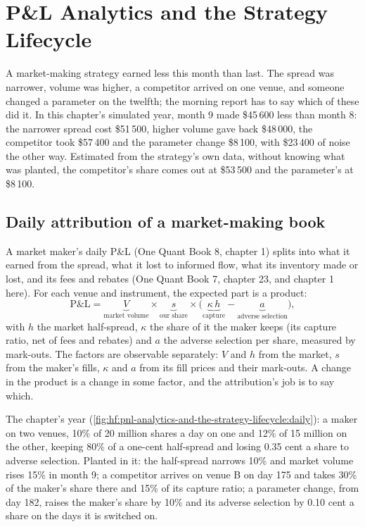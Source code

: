 \chapter{P\&L Analytics and the Strategy Lifecycle}\label{ch:hf:pnl-analytics-and-the-strategy-lifecycle}

A market-making strategy earned less this month than last. The spread was narrower, volume was higher, a competitor arrived on one venue, and
someone changed a parameter on the twelfth; the morning report has to say which of these did it. In this chapter's simulated year, month 9 made
\$45\,600 less than month 8: the narrower spread cost \$51\,500, higher volume gave back \$48\,000, the competitor took \$57\,400 and the parameter change
\$8\,100, with \$23\,400 of noise the other way. Estimated from the strategy's own data, without knowing what was planted, the competitor's share comes
out at \$53\,500 and the parameter's at \$8\,100.

\section{Daily attribution of a market-making book}

A market maker's daily P\&L (One Quant Book 8, chapter 1) splits into what it earned from the spread, what it lost to informed flow, what its
inventory made or lost, and its fees and rebates (One Quant Book 7, chapter 23, and chapter 1 here). For each venue and instrument, the expected part
is a product:
\[
\text{P\&L}=\underbrace{V}_{\text{market volume}}\times\underbrace{s}_{\text{our share}}\times\bigl(\underbrace{\kappa\,h}_{\text{capture}}
-\underbrace{a}_{\text{adverse selection}}\bigr),
\]
with $h$ the market half-spread, $\kappa$ the share of it the maker keeps (its capture ratio, net of fees and rebates) and $a$ the adverse selection
per share, measured by mark-outs. The factors are observable separately: $V$ and $h$ from the market, $s$ from the maker's fills, $\kappa$ and $a$ from
its fill prices and their mark-outs. A change in the product is a change in some factor, and the attribution's job is to say which.

The chapter's year (\cref{fig:hf:pnl-analytics-and-the-strategy-lifecycle:daily}): a maker on two venues, 10\% of 20 million shares a day on one and
12\% of 15 million on the other, keeping 80\% of a one-cent half-spread and losing 0.35 cent a share to adverse selection. Planted in it: the half-spread
narrows 10\% and market volume rises 15\% in month 9; a competitor arrives on venue B on day 175 and takes 30\% of the maker's share there and 15\%
of its capture ratio; a parameter change, from day 182, raises the maker's share by 10\% and its adverse selection by 0.10 cent a share on the days
it is switched on.

